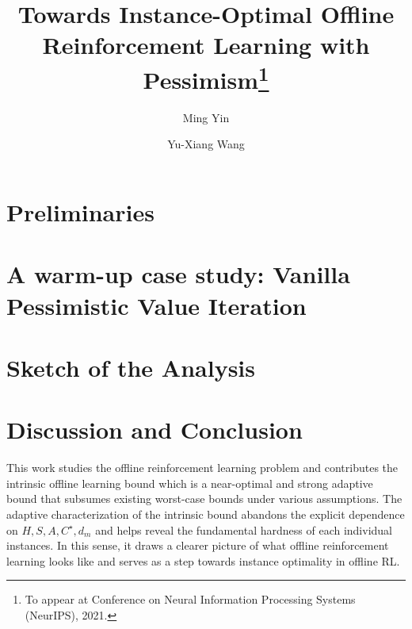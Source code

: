 \documentclass[11pt]{article}
\begin{document}
\title{{Towards Instance-Optimal Offline Reinforcement Learning with Pessimism\footnote{To appear at {Conference on Neural Information Processing Systems} (NeurIPS), 2021.}}}

\author[1,2]{Ming Yin }
\author[1]{Yu-Xiang Wang}



\date{}

\maketitle

\begin{abstract}
	
\end{abstract}

\tableofcontents



\section{Preliminaries }\label{sec:formulation}


\section{A warm-up case study: Vanilla Pessimistic Value Iteration}\label{sec:VPVI}





\section{Sketch of the Analysis}\label{sec:proof_sketch}


\section{Discussion and Conclusion}\label{sec:conclusion}

This work studies the offline reinforcement learning problem and contributes the intrinsic offline learning bound which is a near-optimal and strong adaptive bound that subsumes existing worst-case bounds under various assumptions. The adaptive characterization of the intrinsic bound abandons the explicit dependence on $H,S,A,C^\star,d_m$ and helps reveal the fundamental hardness of each individual instances. In this sense, it draws a clearer picture of what offline reinforcement learning looks like and serves as a step towards instance optimality in offline RL. 
\end{document}
